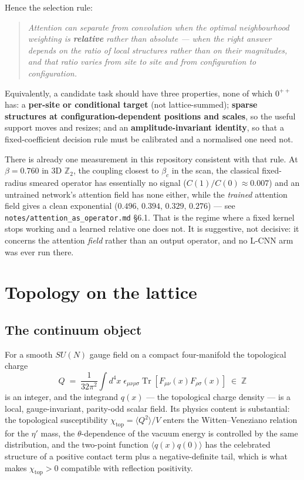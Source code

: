 \documentclass[11pt,a4paper]{article}
\begin{document}
Hence the selection rule:
\begin{quote}
\emph{Attention can separate from convolution when the optimal neighbourhood
weighting is \textbf{relative} rather than absolute --- when the right answer
depends on the ratio of local structures rather than on their magnitudes, and
that ratio varies from site to site and from configuration to configuration.}
\end{quote}
Equivalently, a candidate task should have three properties, none of which
$0^{++}$ has: a \textbf{per-site or conditional target} (not lattice-summed);
\textbf{sparse structures at configuration-dependent positions and scales}, so
the useful support moves and resizes; and an \textbf{amplitude-invariant
identity}, so that a fixed-coefficient decision rule must be calibrated and a
normalised one need not.

There is already one measurement in this repository consistent with that rule.
At $\beta = 0.760$ in $3$D $\mathbb{Z}_2$, the coupling closest to $\beta_c$ in
the scan, the classical fixed-radius smeared operator has essentially no signal
($C(1)/C(0) \approx 0.007$) and an untrained network's attention field has none
either, while the \emph{trained} attention field gives a clean exponential
($0.496,\,0.394,\,0.329,\,0.276$) --- see
\texttt{notes/attention\_as\_operator.md} \S6.1. That is the regime where a
fixed kernel stops working and a learned relative one does not. It is
suggestive, not decisive: it concerns the attention \emph{field} rather than an
output operator, and no L-CNN arm was ever run there.

\section{Topology on the lattice}

\subsection{The continuum object}

For a smooth $SU(N)$ gauge field on a compact four-manifold the topological
charge
\begin{equation}
  Q \;=\; \frac{1}{32\pi^2}\int d^4x\; \epsilon_{\mu\nu\rho\sigma}
          \operatorname{Tr}\!\left[F_{\mu\nu}(x) F_{\rho\sigma}(x)\right]
  \;\in\; \mathbb{Z}
  \label{eq:Qcont}
\end{equation}
is an integer, and the integrand $q(x)$ --- the topological charge density --- is
a local, gauge-invariant, parity-odd scalar field. Its physics content is
substantial: the topological susceptibility $\chi_{\mathrm{top}} = \langle Q^2
\rangle / V$ enters the Witten--Veneziano relation for the $\eta'$ mass, the
$\theta$-dependence of the vacuum energy is controlled by the same distribution,
and the two-point function $\langle q(x) q(0) \rangle$ has the celebrated
structure of a positive contact term plus a negative-definite tail, which is
what makes $\chi_{\mathrm{top}} > 0$ compatible with reflection positivity.
\end{document}

